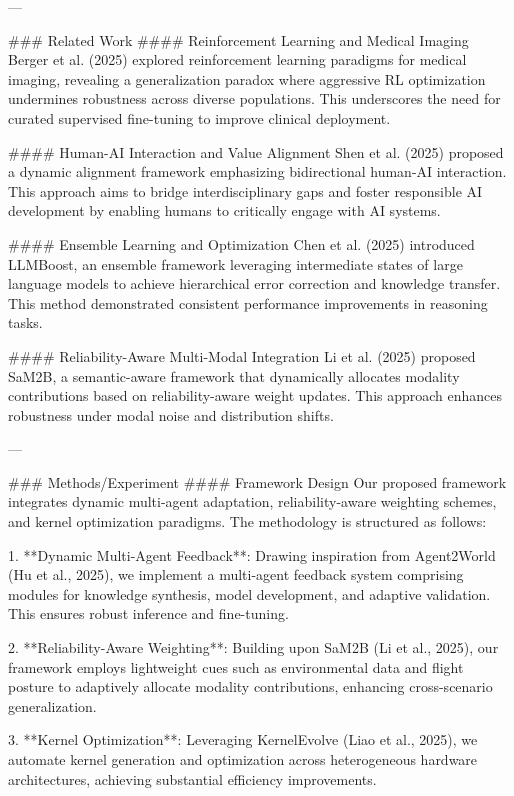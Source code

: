---

### Related Work
#### Reinforcement Learning and Medical Imaging
Berger et al. (2025) explored reinforcement learning paradigms for medical imaging, revealing a generalization paradox where aggressive RL optimization undermines robustness across diverse populations. This underscores the need for curated supervised fine-tuning to improve clinical deployment.

#### Human-AI Interaction and Value Alignment
Shen et al. (2025) proposed a dynamic alignment framework emphasizing bidirectional human-AI interaction. This approach aims to bridge interdisciplinary gaps and foster responsible AI development by enabling humans to critically engage with AI systems.

#### Ensemble Learning and Optimization
Chen et al. (2025) introduced LLMBoost, an ensemble framework leveraging intermediate states of large language models to achieve hierarchical error correction and knowledge transfer. This method demonstrated consistent performance improvements in reasoning tasks.

#### Reliability-Aware Multi-Modal Integration
Li et al. (2025) proposed SaM2B, a semantic-aware framework that dynamically allocates modality contributions based on reliability-aware weight updates. This approach enhances robustness under modal noise and distribution shifts.

---

### Methods/Experiment
#### Framework Design
Our proposed framework integrates dynamic multi-agent adaptation, reliability-aware weighting schemes, and kernel optimization paradigms. The methodology is structured as follows:

1. **Dynamic Multi-Agent Feedback**:
   Drawing inspiration from Agent2World (Hu et al., 2025), we implement a multi-agent feedback system comprising modules for knowledge synthesis, model development, and adaptive validation. This ensures robust inference and fine-tuning.

2. **Reliability-Aware Weighting**:
   Building upon SaM2B (Li et al., 2025), our framework employs lightweight cues such as environmental data and flight posture to adaptively allocate modality contributions, enhancing cross-scenario generalization.

3. **Kernel Optimization**:
   Leveraging KernelEvolve (Liao et al., 2025), we automate kernel generation and optimization across heterogeneous hardware architectures, achieving substantial efficiency improvements.


